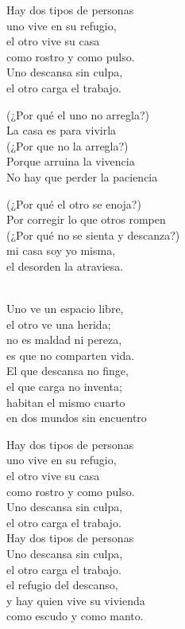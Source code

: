 \begin{lyrics}
 Hay dos tipos de personas\\
 uno vive en su refugio,\\
el otro vive su casa\\
como rostro y como pulso.\\
 Uno descansa sin culpa,\\
el otro carga el trabajo.

 (¿Por qué el uno no arregla?)\\
 La casa es para vivirla\\
 (¿Por que no la arregla?)\\
 Porque arruina la vivencia\\
No hay que perder la paciencia

 (¿Por qué el otro se enoja?)\\
 Por corregir lo que otros rompen\\
 (¿Por qué no se sienta y descanza?)\\
 mi casa soy yo misma,\\
el desorden la atraviesa.


\\
Uno ve un espacio libre,\\
el otro ve una herida;\\
no es maldad ni pereza,\\
es que no comparten vida.\\
El que descansa no finge,\\
el que carga no inventa;\\
habitan el mismo cuarto\\
en dos mundos sin encuentro

 Hay dos tipos de personas\\
 uno vive en su refugio,\\
el otro vive su casa\\
como rostro y como pulso.\\
 Uno descansa sin culpa,\\
 el otro carga el trabajo.\\
 Hay dos tipos de personas\\
Uno descansa sin culpa,\\
el otro carga el trabajo.\\
el refugio del descanso,\\
y hay quien vive su vivienda\\
como escudo y como manto.

\end{lyrics}

